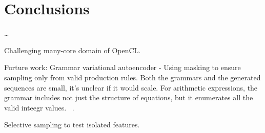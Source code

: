 \section{Conclusions}\label{sec:conclusion}

\ldots

Challenging many-core domain of OpenCL.

Furture work: Grammar variational autoencoder - Using masking to ensure sampling only from valid production rules. Both the grammars and the generated sequences are small, it's unclear if it would scale. For arithmetic expressions, the grammar includes not just the structure of equations, but it enumerates all the valid inteegr values. ~\cite{Kusner2017}.

Selective sampling to test isolated features.